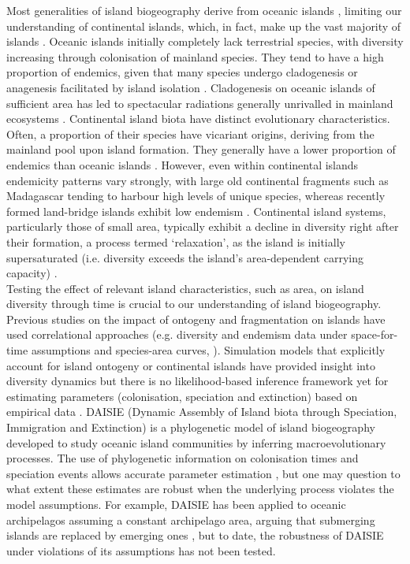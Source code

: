 \documentclass{article}
\begin{document}
Most generalities of island biogeography derive from oceanic islands \citep{whittaker_general_2008}, limiting our understanding of continental islands, which, in fact, make up the vast majority of islands \citep{meiri_oceanic_2017}. Oceanic islands initially completely lack terrestrial species, with diversity increasing through colonisation of mainland species. They tend to have a high proportion of endemics, given that many species undergo cladogenesis or anagenesis facilitated by island isolation \citep{valente_simple_2020}. Cladogenesis on oceanic islands of sufficient area has led to spectacular radiations generally unrivalled in mainland ecosystems \citep{losos_adaptation_2009}. Continental island biota have distinct evolutionary characteristics. Often, a proportion of their species have vicariant origins, deriving from the mainland pool upon island formation. They generally have a lower proportion of endemics than oceanic islands \citep{ali_islands_2018}. However, even within continental islands endemicity patterns vary strongly, with large old continental fragments such as Madagascar tending to harbour high levels of unique species, whereas recently formed land-bridge islands exhibit low endemism \citep{ali_mammals_2019}. Continental island systems, particularly those of small area, typically exhibit a decline in diversity right after their formation, a process termed ‘relaxation’, as the island is initially supersaturated (i.e. diversity exceeds the island’s area-dependent carrying capacity) \citep{diamond_biogeographic_1972, wilcox_supersaturated_1978, tilman_habitat_1994, kuussaari_extinction_2009}. \\

Testing the effect of relevant island characteristics, such as area, on island diversity through time is crucial to our understanding of island biogeography. Previous studies on the impact of ontogeny and fragmentation on islands have used correlational approaches (e.g. diversity and endemism data under space-for-time assumptions and species-area curves, \cite{he_speciesarea_2011, damgaard_critique_2019}). Simulation models that explicitly account for island ontogeny \citep{valente_effects_2014, borregaard_general_2016} or continental islands \citep{rosindell_unified_2013} have provided insight into diversity dynamics but there is no likelihood-based inference framework yet for estimating parameters (colonisation, speciation and extinction) based on empirical data \citep{leidinger_biodiversity_2017}. DAISIE (Dynamic Assembly of Island biota through Speciation, Immigration and Extinction) is a phylogenetic model of island biogeography developed to study oceanic island communities by inferring macroevolutionary processes. The use of phylogenetic information on colonisation times and speciation events allows accurate parameter estimation \citep{valente_using_2018}, but one may question to what extent these estimates are robust when the underlying process violates the model assumptions. For example, DAISIE has been applied to oceanic archipelagos assuming a constant archipelago area, arguing that submerging islands are replaced by emerging ones \citep{valente_equilibrium_2015}, but to date, the robustness of DAISIE under violations of its assumptions has not been tested. \\
\end{document}
